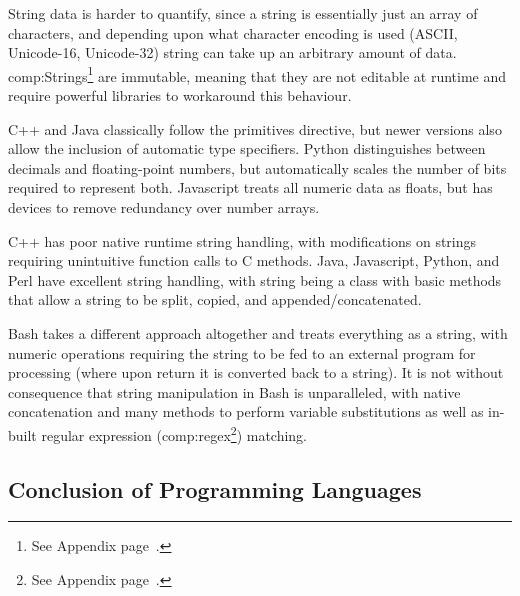 String data is harder to quantify, since a string is essentially just an array of characters, and depending upon what character encoding is used (ASCII, Unicode-16, Unicode-32)  string can take up an arbitrary amount of data. \gls{comp:Strings}\footnote{See Appendix page~\pageref{ref:app:strings}.} are immutable, meaning that they are not editable at runtime and require powerful libraries to workaround this behaviour.

C++ and Java classically follow the primitives directive, but newer versions also allow the inclusion of automatic type specifiers. Python distinguishes between decimals and floating-point numbers, but automatically scales the number of bits required to represent both.  Javascript treats all numeric data as floats, but has devices to remove redundancy over number arrays. 

C++ has poor native runtime string handling, with modifications on strings requiring unintuitive function calls to C methods. Java, Javascript, Python, and Perl have excellent string handling, with string being a class with basic methods that allow a string to be split, copied, and appended/concatenated. 

Bash takes a different approach altogether and treats everything as a string, with numeric operations requiring the string to be fed to an external program for processing (where upon return it is converted back to a string). It is not without consequence that string manipulation in Bash is unparalleled, with native concatenation and many methods to perform variable substitutions as well as in-built regular expression (\gls{comp:regex}\footnote{See Appendix page~\pageref{ref:app:regex}.}) matching.



\subsection{Conclusion of Programming Languages}

